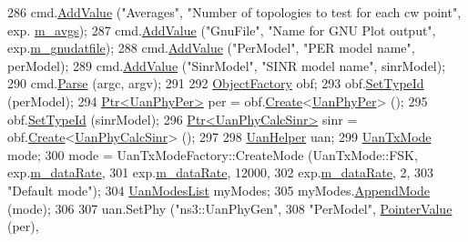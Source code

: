 \begin{DoxyCode}
286   cmd.\hyperlink{classns3_1_1CommandLine_addcfb546c7ad4c8bd0965654d55beb8e}{AddValue} (\textcolor{stringliteral}{"Averages"}, \textcolor{stringliteral}{"Number of topologies to test for each cw point"}, exp.
      \hyperlink{classExperiment_a51ad00a867fb74254c5ec3d4e0e34272}{m\_avgs});
287   cmd.\hyperlink{classns3_1_1CommandLine_addcfb546c7ad4c8bd0965654d55beb8e}{AddValue} (\textcolor{stringliteral}{"GnuFile"}, \textcolor{stringliteral}{"Name for GNU Plot output"}, exp.\hyperlink{classExperiment_aaa700bd4f3a5f4cf40c866b38ea106e4}{m\_gnudatfile});
288   cmd.\hyperlink{classns3_1_1CommandLine_addcfb546c7ad4c8bd0965654d55beb8e}{AddValue} (\textcolor{stringliteral}{"PerModel"}, \textcolor{stringliteral}{"PER model name"}, perModel);
289   cmd.\hyperlink{classns3_1_1CommandLine_addcfb546c7ad4c8bd0965654d55beb8e}{AddValue} (\textcolor{stringliteral}{"SinrModel"}, \textcolor{stringliteral}{"SINR model name"}, sinrModel);
290   cmd.\hyperlink{classns3_1_1CommandLine_a5c10b85b3207e5ecb48d907966923156}{Parse} (argc, argv);
291 
292   \hyperlink{classns3_1_1ObjectFactory}{ObjectFactory} obf;
293   obf.\hyperlink{classns3_1_1ObjectFactory_a77dcd099064038a1eb7a6b8251229ec3}{SetTypeId} (perModel);
294   \hyperlink{classns3_1_1Ptr}{Ptr<UanPhyPer>} per = obf.\hyperlink{classns3_1_1ObjectFactory_a18152e93f0a6fe184ed7300cb31e9896}{Create}<\hyperlink{classns3_1_1UanPhyPer}{UanPhyPer}> ();
295   obf.\hyperlink{classns3_1_1ObjectFactory_a77dcd099064038a1eb7a6b8251229ec3}{SetTypeId} (sinrModel);
296   \hyperlink{classns3_1_1Ptr}{Ptr<UanPhyCalcSinr>} sinr = obf.\hyperlink{classns3_1_1ObjectFactory_a18152e93f0a6fe184ed7300cb31e9896}{Create}<\hyperlink{classns3_1_1UanPhyCalcSinr}{UanPhyCalcSinr}> ();
297 
298   \hyperlink{classns3_1_1UanHelper}{UanHelper} uan;
299   \hyperlink{classns3_1_1UanTxMode}{UanTxMode} mode;
300   mode = UanTxModeFactory::CreateMode (UanTxMode::FSK, exp.\hyperlink{classExperiment_a5b781fcc8b0242604e4378c1df035228}{m\_dataRate},
301                                        exp.\hyperlink{classExperiment_a5b781fcc8b0242604e4378c1df035228}{m\_dataRate}, 12000,
302                                        exp.\hyperlink{classExperiment_a5b781fcc8b0242604e4378c1df035228}{m\_dataRate}, 2,
303                                        \textcolor{stringliteral}{"Default mode"});
304   \hyperlink{classns3_1_1UanModesList}{UanModesList} myModes;
305   myModes.\hyperlink{classns3_1_1UanModesList_ae47998ab8ad053aecd5f2849043ec403}{AppendMode} (mode);
306 
307   uan.SetPhy (\textcolor{stringliteral}{"ns3::UanPhyGen"},
308               \textcolor{stringliteral}{"PerModel"}, \hyperlink{classns3_1_1PointerValue}{PointerValue} (per),

\end{DoxyCode}
